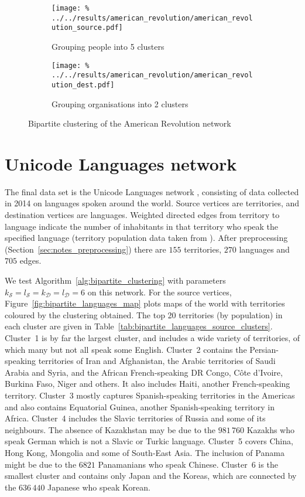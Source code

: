 \documentclass[12pt]{ociamthesis}
\theoremstyle{plain}
\theoremstyle{definition}
\theoremstyle{remark}
\newcommand\ca[1]{\mathcal{#1}}
\begin{document}
\begin{figure}[H]
\begin{subfigure}{.49\textwidth}
\centering
\texttt{[image: \%
../../results/american\_revolution/american\_revolution\_source.pdf]}
\caption{Grouping people into 5 clusters}
\label{fig:bipartite_revolution_source}
\end{subfigure}
\begin{subfigure}{.49\textwidth}
\centering
\texttt{[image: \%
../../results/american\_revolution/american\_revolution\_dest.pdf]}
\caption{Grouping organisations into 2 clusters}
\label{fig:bipartite_revolution_dest}
\end{subfigure}
\caption{Bipartite clustering of the American Revolution network}
\label{fig:bipartite_revolution}
\end{figure}

\section{Unicode Languages network} \label{sec:bipartite_languages}

The final data set is the Unicode Languages network \cite{konect:unicodelang},
consisting of data collected in 2014 on languages spoken around the world.
Source vertices are territories, and destination vertices are languages.
Weighted directed edges from territory to language indicate the number of
inhabitants in that territory who speak the specified language (territory
population data taken from \cite{geonames}).
After preprocessing (Section~\ref{sec:notes_preprocessing}) there are $155$
territories, $270$ languages and $705$ edges.

We test Algorithm~\ref{alg:bipartite_clustering} with parameters $k_\ca{S} =
l_\ca{S} = k_\ca{D} = l_\ca{D} = 6$ on this network.
For the source vertices, Figure~\ref{fig:bipartite_languages_map} plots maps of
the world with territories coloured by the clustering obtained. The top 20
territories (by population) in each cluster are given in
Table~\ref{tab:bipartite_languages_source_clusters}.
Cluster~1 is by far the largest cluster, and includes a wide variety of
territories, of which many but not all speak some English.
Cluster~2 contains the Persian-speaking territories of Iran and Afghanistan,
the Arabic territories of Saudi Arabia and Syria, and the African
French-speaking DR Congo, C\^ote d'Ivoire, Burkina Faso, Niger and others. It
also includes Haiti, another French-speaking territory.
Cluster~3 mostly captures Spanish-speaking territories in the Americas and also
contains Equatorial Guinea, another Spanish-speaking territory in Africa.
Cluster~4 includes the Slavic territories of Russia and some of its neighbours.
The absence of Kazakhstan may be due to the $981 \, 760$ Kazakhs who speak
German which is not a Slavic or Turkic language.
Cluster~5 covers China, Hong Kong, Mongolia and some of South-East Asia. The
inclusion of Panama might be due to the $6821$ Panamanians who speak Chinese.
Cluster~6 is the smallest cluster and contains only Japan and the Koreas, which
are connected by the $636 \, 440$ Japanese who speak Korean.
\end{document}
